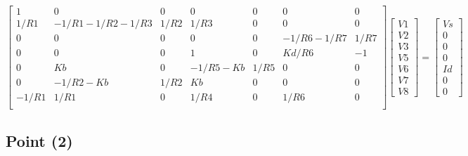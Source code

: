 $$
\begin{bmatrix} 
   1     & 0               & 0    & 0           & 0    & 0          & 0    \\
   1/R1  & -1/R1-1/R2-1/R3 & 1/R2 & 1/R3        & 0    & 0          & 0    \\
   0     & 0               & 0    & 0           & 0    & -1/R6-1/R7 & 1/R7 \\
   0     & 0               & 0    & 1           & 0    & Kd/R6      & -1   \\
   0     & Kb              & 0    & -1/R5-Kb    & 1/R5 & 0          & 0    \\
   0     & -1/R2-Kb        & 1/R2 & Kb          & 0    & 0          & 0    \\
   -1/R1 & 1/R1            & 0    & 1/R4        & 0    & 1/R6       & 0    \\
\end {bmatrix} 
\begin{bmatrix}
V1 \\ V2 \\ V3 \\ V5 \\ V6 \\ V7 \\ V8
\end {bmatrix} 
=
\begin{bmatrix} 
Vs \\ 0 \\ 0 \\ 0 \\ Id \\ 0 \\ 0
\end {bmatrix} 
$$ 


%    

\subsection{Point (2)} 

